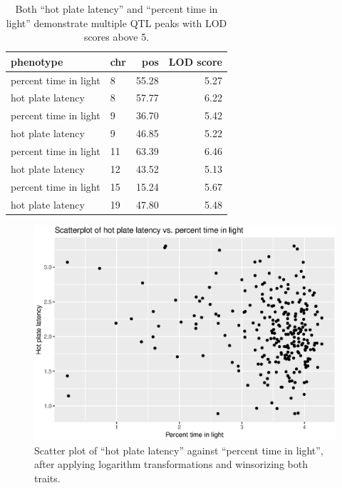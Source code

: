 \documentclass[12pt,twoside, lineno]{gsajnl}
\begin{document}
\begin{table}
\caption{Both ``hot plate latency'' and ``percent time in light''
  demonstrate multiple QTL peaks with LOD scores above 5.}
  \label{table-peaks}
\begin{center}
\begin{tabular}{l|lrr}
  \hline
phenotype & chr & pos & LOD score \\
   \hline
percent time in light & 8 & 55.28 & 5.27 \\
 hot plate latency & 8 & 57.77 & 6.22 \\
 percent time in light & 9 & 36.70 & 5.42 \\
 hot plate latency & 9 & 46.85 & 5.22 \\
 percent time in light & 11 & 63.39 & 6.46 \\
 hot plate latency & 12 & 43.52 & 5.13 \\
 percent time in light & 15 & 15.24 & 5.67 \\
 hot plate latency & 19 & 47.80 & 5.48 \\
   \hline
\end{tabular}
\end{center}
\end{table}







\clearpage


\renewcommand{\thefigure}{\textbf{S\arabic{figure}}}
\setcounter{figure}{0}

\begin{figure}
\includegraphics[width = \textwidth]{../Rmd/scatter.eps}
\caption{Scatter plot of ``hot plate latency'' against ``percent time in
  light'', after applying logarithm transformations and winsorizing
  both traits.}
\label{fig:scatter}
\end{figure}
\end{document}
